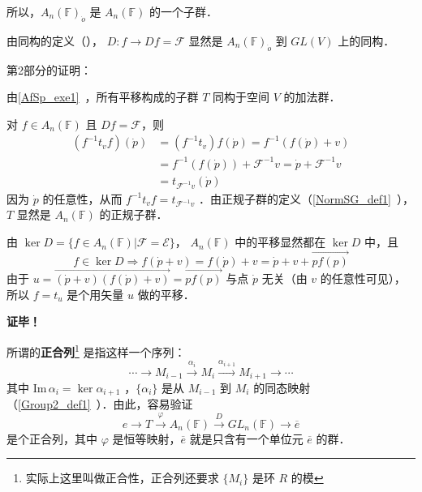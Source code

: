 所以，$A_n(\mathbb F)_{\dot o}$ 是 $A_n(\mathbb F)$ 的一个子群．

由同构的定义（）， $D:f\rightarrow Df=\mathcal F$ 显然是 $A_n(\mathbb F)_{\dot o}$ 到 $GL(V)$ 上的同构．

第2部分的证明：

由\autoref{AfSp_exe1}~，所有平移构成的子群 $T$ 同构于空间 $V$ 的加法群．
 
对 $f\in A_n(\mathbb F)$ 且 $Df=\mathcal F$，则
\begin{equation}
\begin{aligned}
(f^{-1}t_vf)(\dot p)&=(f^{-1}t_v)f(\dot p)=f^{-1}(f(\dot p)+v)\\
&=f^{-1}(f(\dot p))+\mathcal F^{-1}v=\dot p+\mathcal F^{-1}v\\
&=t_{\mathcal F^{-1}v}(\dot p)
\end{aligned}
\end{equation}
因为 $\dot p$ 的任意性，从而 $f^{-1}t_vf=t_{\mathcal F^{-1}v}$ ．由正规子群的定义（\autoref{NormSG_def1}~），$T$ 显然是 $A_n(\mathbb F)$ 的正规子群．

由 $\ker D=\{f\in A_n(\mathbb F)|\mathcal F=\mathcal E\}$， $A_n(\mathbb F)$ 中的平移显然都在 $\ker D$ 中，且
\begin{equation}
f\in \ker D\Rightarrow f(\dot p+v)=f(\dot p)+v=\dot p+v+\overrightarrow{pf(p)}
\end{equation}
由于 $u=\overrightarrow{(\dot p+v)(f(\dot p)+v)}=\overrightarrow{pf(p)}$ 与点 $\dot p$ 无关（由 $v$ 的任意性可见），所以 $f=t_u$ 是个用矢量 $u$ 做的平移．

\textbf{证毕！}

所谓的\textbf{正合列}\footnote{实际上这里叫做正合性，正合列还要求 $\{M_i\}$ 是环 $R$ 的模} 是指这样一个序列：
\begin{equation}
\cdots\rightarrow M_{i-1}\xrightarrow{\alpha_i} M_{i}\xrightarrow{\alpha_{i+1}}M_{i+1}\rightarrow\cdots
\end{equation}
其中 $\mathrm{Im}\,\alpha_{i}=\ker\alpha_{i+1}$ ，$\{\alpha_i\}$ 是从 $M_{i-1}$ 到 $M_i$ 的同态映射（\autoref{Group2_def1}~）．由此，容易验证
\begin{equation}
e\rightarrow T\xrightarrow{\varphi}A_n(\mathbb F)\xrightarrow{D} GL_n(\mathbb F)\rightarrow \overline{e}
\end{equation}
是个正合列，其中 $\varphi$ 是恒等映射，$\overline{e}$ 就是只含有一个单位元 $\overline{e}$ 的群． 